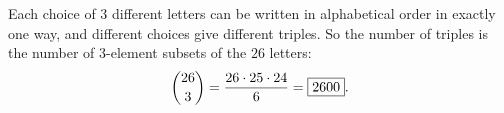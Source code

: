 Each choice of $3$ different letters can be written in alphabetical order in exactly one way, and different choices give different triples. So the number of triples is the number of $3$-element subsets of the $26$ letters:
\[\dbinom{26}{3}=\dfrac{26\cdot25\cdot24}{6}=\boxed{2600}.\]
